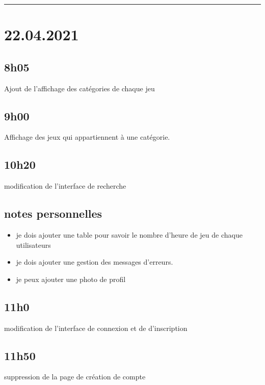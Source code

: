 \documentclass[a4paper,12pt,french]{sphinxmanual}
\begin{document}
\bigskip\hrule\bigskip



\section{22.04.2021}
\label{\detokenize{logbook:id13}}

\subsection{8h05}
\label{\detokenize{logbook:id14}}
\sphinxAtStartPar
Ajout de l’affichage des catégories de chaque jeu


\subsection{9h00}
\label{\detokenize{logbook:id15}}
\sphinxAtStartPar
Affichage des jeux qui appartiennent à une catégorie.


\subsection{10h20}
\label{\detokenize{logbook:id16}}
\sphinxAtStartPar
modification de l’interface de recherche


\subsection{notes personnelles}
\label{\detokenize{logbook:notes-personnelles}}\begin{itemize}
\item {} 
\sphinxAtStartPar
je dois ajouter une table pour savoir le nombre d’heure de jeu de chaque utilisateurs

\item {} 
\sphinxAtStartPar
je dois ajouter une gestion des messages d’erreurs.

\item {} 
\sphinxAtStartPar
je peux ajouter une photo de profil

\end{itemize}


\subsection{11h0}
\label{\detokenize{logbook:h0}}
\sphinxAtStartPar
modification de l’interface de connexion et de d’inscription


\subsection{11h50}
\label{\detokenize{logbook:h50}}
\sphinxAtStartPar
suppression de la page de création de compte
\end{document}
